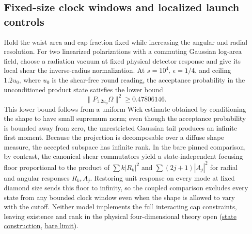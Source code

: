 \documentclass[10pt,a4paper]{article}
\numberwithin{equation}{section}
\newcommand{\repo}[2]{\href{https://github.com/sprajs/quantum-gravity/blob/main/#1}{#2}}
\begin{document}
\subsection{Fixed-size clock windows and localized launch controls}
Hold the waist area and cap fraction fixed while increasing the angular and radial resolution. For two linearized polarizations with a commuting Gaussian log-area field, choose a radiation vacuum at fixed physical detector response and give its local shear the inverse-radius normalization. At $s=10^4$, $\epsilon=1/4$, and ceiling $1.2u_0$, where $u_0$ is the shear-free round reading, the acceptance probability in the unconditioned product state satisfies the lower bound
\[
  \|P_{1.2u_0}\Omega\|^2\ge0.47806146.
\]
This lower bound follows from a uniform Wick estimate obtained by conditioning the shape to have small supremum norm; even though the acceptance probability is bounded away from zero, the unrestricted Gaussian tail produces an infinite first moment. Because the projection is decomposable over a diffuse shape measure, the accepted subspace has infinite rank. In the bare pinned comparison, by contrast, the canonical shear commutators yield a state-independent focusing floor proportional to the product of $\sum k|R_k|^2$ and $\sum (2j+1)|A_j|^2$ for radial and angular responses $R_k,A_j$. Restoring unit response on every mode at fixed diamond size sends this floor to infinity, so the coupled comparison excludes every state from any bounded clock window even when the shape is allowed to vary with the cutoff. Neither model implements the full interacting cap constraints, leaving existence and rank in the physical four-dimensional theory open (\repo{audit/fluctuating-corner-state.md}{state construction}, \repo{audit/existence-limit.md}{bare limit}).
\end{document}
